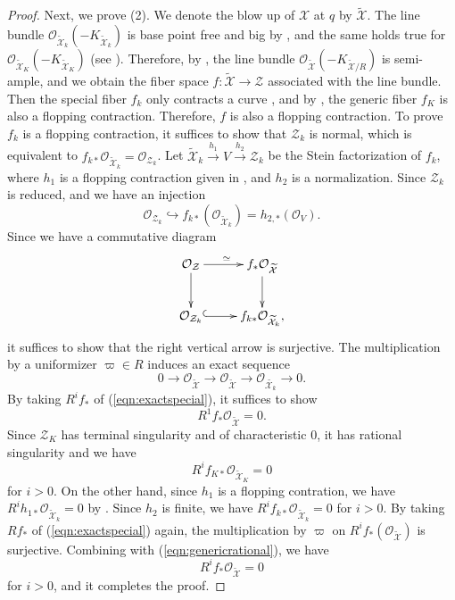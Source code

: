 \documentclass[autodetect-engine, a4paper]{amsart}
\theoremstyle{definition}
\def\cO{\mathcal{O}}
\begin{document}
\begin{proof}
Next, we prove (2). We denote the blow up of $\mathcal{X}$ at $q$ by $\widetilde{\mathcal{X}}$.
The line bundle $\cO_{\widetilde{\mathcal{X}}_{k}} (- K_{\widetilde{\mathcal{X}}_{k}})$ is base point free and big by \cite[Proposition 7.2]{Tanaka2}, and the same holds true for $\cO_{\widetilde{\mathcal{X}}_{K}} (- K_{\widetilde{\mathcal{X}}_{K}})$ (see \cite[Proposition 4.4.1]{Iskovskikh-Prokhorov}).
Therefore, by \cite[Theorem 1.2]{Witaszek},
the line bundle $\cO_{\widetilde{\mathcal{X}}} (- K_{\widetilde{\mathcal{X}}/R})$ is semi-ample, and we obtain the fiber space $f \colon \widetilde{\mathcal{X}} \rightarrow \mathcal{Z}$ associated with the line bundle.
Then the special fiber $f_{k}$ only contracts a curve \cite[Proposition 7.3 and Proposition 7.8]{Tanaka2},  
and by \cite[Proposition 4.4.1]{Iskovskikh-Prokhorov}, the generic fiber $f_{K}$ is also a flopping contraction.
Therefore, $f$ is also a flopping contraction. 
To prove $f_{k}$ is a flopping contraction, it suffices to show that $\mathcal{Z}_{k}$ is normal, which is equivalent to $f_{k \ast} \cO_{\widetilde{\mathcal{X}}_{k}} = \cO_{\mathcal{Z}_{k}}$.
Let $\widetilde{\mathcal{X}}_{k} \xrightarrow{h_{1}} V \xrightarrow{h_{2}} \mathcal{Z}_{k}$ be the Stein factorization of $f_{k}$, where $h_1$ is a flopping contraction given in \cite[Proposition 7.3 and Proposition 7.8]{Tanaka2}, and $h_{2}$ is a normalization. 
Since $\mathcal{Z}_{k}$ is reduced, and we have an injection
\[
\cO_{\mathcal{Z}_{k}} \hookrightarrow f_{k \ast} (\cO_{\widetilde{\mathcal{X}}_{k}}) = h_{2,\ast} (\cO_{V}). 
\]
Since we have a commutative diagram
\[
 \xymatrix{
\cO_{\mathcal{Z}} \ar[r]^{\simeq} \ar[d]
& f_{\ast} \cO_{\widetilde{\mathcal{X}}}  \ar[d]\\
\cO_{\mathcal{Z}_{k}}
 \ar@{^{(}->}[r] &
f_{k \ast} \cO_{\widetilde{\mathcal{X}}_{k}},
}
\]
it suffices to show that the right vertical arrow is surjective.
The multiplication by a uniformizer $\varpi \in R$ induces an exact sequence
\begin{equation}
\label{eqn:exactspecial}
0 \rightarrow \cO_{\widetilde{\mathcal{X}}} \rightarrow \cO_{\widetilde{\mathcal{X}}} \rightarrow \cO_{\widetilde{\mathcal{X}_{k}}} \rightarrow 0.
\end{equation}
By taking $R^i f_{\ast}$ of (\ref{eqn:exactspecial}), it suffices to show 
\[
R^1 f_{\ast} \cO_{\widetilde{\mathcal{X}}} =0.
\]
Since $\mathcal{Z}_{K}$ has terminal singularity and of characteristic 0, it has rational singularity and we have 
\begin{equation}
\label{eqn:genericrational}
R^i f_{K \ast} \cO_{\widetilde{\mathcal{X}}_{K}} = 0
\end{equation}
for $i>0$.
On the other hand, since $h_{1}$ is a flopping contration, we have $R^i h_{1 \ast} \cO_{\widetilde{\mathcal{X}}_k} = 0$ by \cite[Proposition 6.10]{Tanakaflop}.
Since $h_2$ is finite, we have $R^i f_{k \ast} \cO_{\widetilde{\mathcal{X}}_k} = 0$ for $i>0$.
By taking $Rf_{\ast}$ of (\ref{eqn:exactspecial}) again, the multiplication by $\varpi$ on  $R^i f_\ast (\cO_{\widetilde{\mathcal{X}}})$ is surjective.
Combining with (\ref{eqn:genericrational}), we have \[
R^i f_{\ast} \cO_{\widetilde{\mathcal{X}}} = 0
\]
for $i>0$, and it completes the proof.
 

\end{proof}
\end{document}
